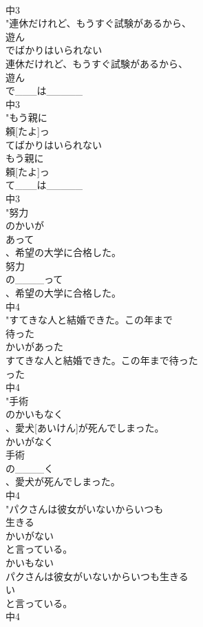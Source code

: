 \documentclass[8pt]{extreport}
\begin{document}
\begin{CJK}{UTF8}{min}
\\	中3
\\	"連休だけれど、もうすぐ試験があるから、
\\	遊ん
\\	でばかりはいられない
\\	連休だけれど、もうすぐ試験があるから、
\\	遊ん
\\	で___は_____
\\	中3
\\	"もう親に
\\	頼[たよ]っ
\\	てばかりはいられない
\\	もう親に
\\	頼[たよ]っ
\\	て___は_____
\\	中3
\\	"努力
\\	のかいが
\\	あって
\\	、希望の大学に合格した。
\\	努力
\\	の____って
\\	、希望の大学に合格した。
\\	中4
\\	"すてきな人と結婚できた。この年まで
\\	待った
\\	かいがあった
\\	すてきな人と結婚できた。この年まで待った
\\	った
\\	中4
\\	"手術
\\	のかいもなく
\\	、愛犬[あいけん]が死んでしまった。
\\	かいがなく
\\	手術
\\	の____く
\\	、愛犬が死んでしまった。
\\	中4
\\	"パクさんは彼女がいないからいつも
\\	生きる
\\	かいがない
\\	と言っている。
\\	かいもない
\\	パクさんは彼女がいないからいつも生きる
\\	い
\\	と言っている。
\\	中4

\end{CJK}
\end{document}
